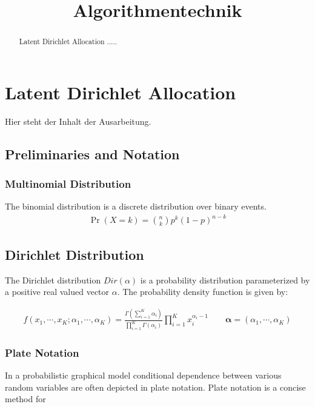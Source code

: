 \documentclass[a4paper,ngerman]{atseminar}
\title{Algorithmentechnik}
\author{}
\begin{document}
\maketitle

\ENGLISH

\section{Latent Dirichlet Allocation}

\begin{abstract}
Latent Dirichlet Allocation .....
\end{abstract}

Hier steht der Inhalt der Ausarbeitung.

\subsection{Preliminaries and Notation}

\subsubsection{Multinomial Distribution}

The binomial distribution is a discrete distribution over binary events.	
\begin{align*}
\Pr(X = k) = \binom n k  p^k(1-p)^{n-k}
\end{align*}


\subsection{Dirichlet Distribution}
The Dirichlet distribution $Dir(\alpha)$ is a probability distribution parameterized by a positive real valued vector $\alpha$.
The probability density function is given by:

\begin{align*}
f \left(x_1,\cdots, x_{K}; \alpha_1,\cdots, \alpha_K \right) = \frac{\Gamma\left(\sum_{i=1}^K \alpha_i\right)}{\prod_{i=1}^K \Gamma(\alpha_i)} \prod_{i=1}^K x_i^{\alpha_i - 1}       \qquad\boldsymbol{\alpha}=(\alpha_1,\cdots,\alpha_K) 
\end{align*}


\subsubsection{Plate Notation}
In a probabilistic graphical model conditional dependence between various random variables are often depicted in plate notation.
Plate notation is a concise method for 
\end{document}
